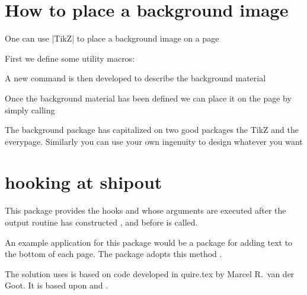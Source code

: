 \section{How to place a background image}

One can use |TikZ| to place a background image on a page

First we define some utility macros:


\begin{teXXX}
  \def\bg@contents{Draft}
  \def\bg@color{red!45}
  \def\bg@angle{60}
  \def\bg@opacity{.5}
  \def\bg@scale{15}
  \def\bg@position{current page.center}
  \def\bg@anchor{}
  \def\bg@hshift{0}
  \def\bg@vshift{0}
\end{teXXX}

A new command is then developed to describe the background material

\begin{teX}
\newcommand\bg@material{%
   \begin{tikzpicture}[remember picture,overlay]
   \node [rotate=\bg@angle,scale=\bg@scale,opacity=\bg@opacity,%
   xshift=\bg@hshift,yshift=\bg@vshift,color=\bg@color]
   at (\bg@position) [\bg@anchor] {\bg@contents};
  \end{tikzpicture}}%
\end{teX}

Once the background material has been defined we can place it on the page by simply calling

\begin{teXXX}
   \newcommand\BgThispage{\AddThispageHook{\bg@material}}
\end{teXXX}

The background package has capitalized on two good packages the TikZ and the everypage. Similarly you can use your own ingenuity to design whatever you want




\section{hooking at shipout}


This package provides the hooks  and 
   whose arguments are executed after the output 
  routine has constructed , and before  is 
  called.

  An example application for this package would be a package for
  adding text to the bottom of each page.
 The   package adopts this method \citep{prelim2e}.

The solution  uses is based on code developed in  \textsf{quire.tex} by
 Marcel R.~van der Goot.  It is based upon  and .



 






































